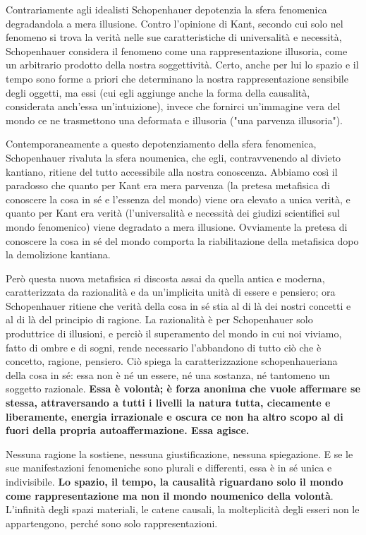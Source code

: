 Contrariamente agli idealisti Schopenhauer depotenzia la sfera fenomenica degradandola a mera illusione. Contro l’opinione di Kant, secondo cui solo nel fenomeno si trova la verità nelle sue caratteristiche di universalità e necessità, Schopenhauer considera il fenomeno come una rappresentazione illusoria, come un arbitrario prodotto della nostra soggettività. Certo, anche per lui lo spazio e il tempo sono forme a priori che determinano la nostra rappresentazione sensibile degli oggetti, ma essi (cui egli aggiunge anche la forma della causalità, considerata anch’essa un’intuizione), invece che fornirci un’immagine vera del mondo ce ne trasmettono una deformata e illusoria ("una parvenza illusoria").

Contemporaneamente a questo depotenziamento della sfera fenomenica, Schopenhauer rivaluta la sfera noumenica, che egli, contravvenendo al divieto kantiano, ritiene del tutto accessibile alla nostra conoscenza. Abbiamo così il paradosso che quanto per Kant era mera parvenza (la pretesa metafisica di conoscere la cosa in sé e l’essenza del mondo) viene ora elevato a unica verità, e quanto per Kant era verità (l’universalità e necessità dei giudizi scientifici sul mondo fenomenico) viene degradato a mera illusione. Ovviamente la pretesa di conoscere la cosa in sé del mondo comporta la riabilitazione della metafisica dopo la demolizione kantiana. 

Però questa nuova metafisica si discosta assai da quella antica e moderna, caratterizzata da razionalità e da un'implicita unità di essere e pensiero; ora Schopenhauer ritiene che verità della cosa in sé stia al di là dei nostri concetti e al di là del principio di ragione. La razionalità è per Schopenhauer solo produttrice di illusioni, e perciò il superamento del mondo in cui noi viviamo, fatto di ombre e di sogni, rende necessario l’abbandono di tutto ciò che è concetto, ragione, pensiero. Ciò spiega la caratterizzazione schopenhaueriana della cosa in sé: essa non è né un essere, né una sostanza, né tantomeno un soggetto razionale. \textbf{Essa è volontà; è forza anonima che vuole affermare se stessa, attraversando a tutti i livelli la natura tutta, ciecamente e liberamente, energia irrazionale e oscura ce non ha altro scopo al di fuori della propria autoaffermazione. Essa agisce.}

Nessuna ragione la sostiene, nessuna giustificazione, nessuna spiegazione. E se le sue manifestazioni fenomeniche sono plurali e differenti, essa è in sé unica e indivisibile.\textbf{ Lo spazio, il tempo, la causalità riguardano solo il mondo come rappresentazione ma non il mondo noumenico della volontà}. L’infinità degli spazi materiali, le catene causali, la molteplicità degli esseri non le appartengono, perché sono solo rappresentazioni.

